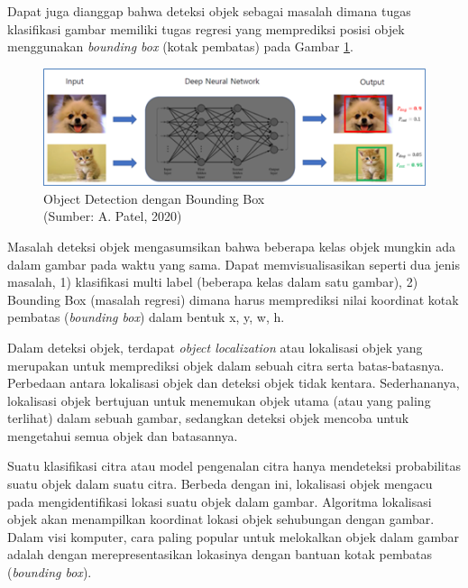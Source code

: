 Dapat juga dianggap bahwa deteksi objek sebagai masalah dimana tugas klasifikasi gambar memiliki tugas regresi yang memprediksi posisi objek menggunakan \textit{bounding box} (kotak pembatas) pada Gambar \ref{img:Object-Bounding-Box}. 

\begin{figure}[H]
	\vspace{-0.1cm}
	\begin{center}
		\includegraphics[width=1\columnwidth]{bab2/Gambar/Picture5.png}
	\end{center}
	\vspace{-0.2cm}
	\caption{Object Detection dengan Bounding Box\\(Sumber: A. Patel, 2020)}\label{img:Object-Bounding-Box}
\end{figure}

Masalah deteksi objek mengasumsikan bahwa beberapa kelas objek mungkin ada dalam gambar pada waktu yang sama. Dapat memvisualisasikan seperti dua jenis masalah, 1) klasifikasi multi label (beberapa kelas dalam satu gambar), 2) Bounding Box (masalah regresi) dimana harus memprediksi nilai koordinat kotak pembatas (\textit{bounding box}) dalam bentuk x, y, w, h.

Dalam deteksi objek, terdapat \textit{object localization} atau lokalisasi objek yang merupakan untuk memprediksi objek dalam sebuah citra serta batas-batasnya. Perbedaan antara lokalisasi objek dan deteksi objek tidak kentara. Sederhananya, lokalisasi objek bertujuan untuk menemukan objek utama (atau yang paling terlihat) dalam sebuah gambar, sedangkan deteksi objek mencoba untuk mengetahui semua objek dan batasannya.

Suatu klasifikasi citra atau model pengenalan citra hanya mendeteksi probabilitas suatu objek dalam suatu citra. Berbeda dengan ini, lokalisasi objek mengacu pada mengidentifikasi lokasi suatu objek dalam gambar. Algoritma lokalisasi objek akan menampilkan koordinat lokasi objek sehubungan dengan gambar. Dalam visi komputer, cara paling popular untuk melokalkan objek dalam gambar adalah dengan merepresentasikan lokasinya dengan bantuan kotak pembatas (\textit{bounding box}).


